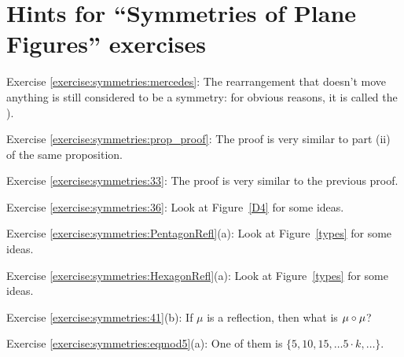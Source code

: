 \section{Hints for ``Symmetries of Plane Figures'' exercises}\label{sec:symmetries:hints}

\noindent Exercise \ref{exercise:symmetries:mercedes}: The rearrangement that doesn't move anything is still considered to be a symmetry: for obvious reasons, it is called the ).

\noindent Exercise \ref{exercise:symmetries:prop_proof}: The proof is very similar to part (ii) of the same proposition.

\noindent Exercise \ref{exercise:symmetries:33}: The proof is very similar to the previous proof.

\noindent Exercise \ref{exercise:symmetries:36}: Look at Figure~\ref{D4} for some ideas.

\noindent Exercise \ref{exercise:symmetries:PentagonRefl}(a): Look at Figure~\ref{types} for some ideas.

\noindent Exercise \ref{exercise:symmetries:HexagonRefl}(a): Look at Figure~\ref{types} for some ideas.

\noindent Exercise \ref{exercise:symmetries:41}(b): If $\mu$ is a reflection, then what is $\mu \circ \mu$?

\noindent Exercise \ref{exercise:symmetries:eqmod5}(a): One of them is  $\{5, 10, 15, \ldots 5\cdot k, \ldots \}$.
